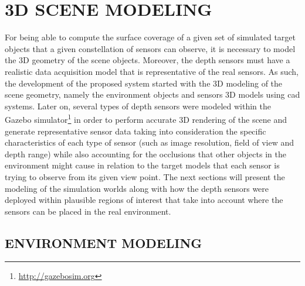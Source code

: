 \section{\uppercase{3D scene modeling}}\label{sec:modeling}

\noindent For being able to compute the surface coverage of a given set of simulated target objects that a given constellation of sensors can observe, it is necessary to model the 3D geometry of the scene objects. Moreover, the depth sensors must have a realistic data acquisition model that is representative of the real sensors. As such, the development of the proposed system started with the 3D modeling of the scene geometry, namely the environment objects and sensors 3D models using \gls{cad} systems. Later on, several types of depth sensors were modeled within the Gazebo simulator\footnote{\url{http://gazebosim.org}} in order to perform accurate 3D rendering of the scene and generate representative sensor data taking into consideration the specific characteristics of each type of sensor (such as image resolution, field of view and depth range) while also accounting for the occlusions that other objects in the environment might cause in relation to the target models that each sensor is trying to observe from its given view point. The next sections will present the modeling of the simulation worlds along with how the depth sensors were deployed within plausible regions of interest that take into account where the sensors can be placed in the real environment.


\subsection{\uppercase{Environment modeling}}

